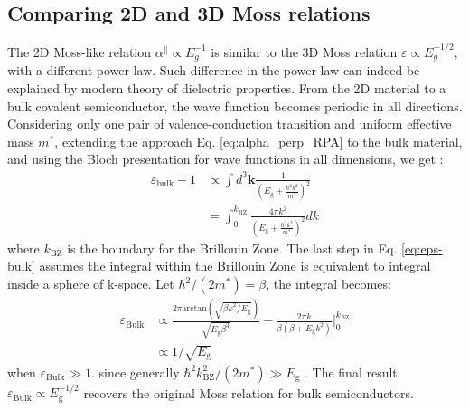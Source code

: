 \documentclass[manuscript=suppinfo,email=true,hyperref=true,keywords=false]{achemso}
\begin{document}
\subsection{Comparing 2D and 3D Moss relations}
\label{ssec:theory-2D}
The 2D Moss-like relation $\alpha^{\parallel} \propto E_{g}^{-1}$ is
similar to the 3D Moss relation $\varepsilon \propto E_{g}^{-1/2}$,
with a different power law. Such difference in the power law can
indeed be explained by modern theory of dielectric properties. From
the 2D material to a bulk covalent semiconductor, the wave function
becomes periodic in all directions. Considering only one pair of
valence-conduction transition and uniform effective mass $m^{*}$,
extending the approach Eq. \ref{eq:alpha_perp_RPA} to the bulk
material, and using the Bloch presentation for wave functions in all
dimensions, we get \cite{Jiang_2017_Eg_Eb}:
\begin{equation}
  \begin{aligned}
    \label{eq:eps-bulk}
    \varepsilon_{\mathrm{bulk}} - 1 &\propto \int d^{3}\mathbf{k}
    {\displaystyle \frac{1}{(E_{\mathrm{g}} + {\displaystyle
          \frac{\hbar^{2} k^{2}}{m^{*}}})^{2}}}\\
    &= \int_{0}^{k_{\mathrm{BZ}}} {\displaystyle
      \frac{4 \pi k^{2}}{(E_{\mathrm{g}} + {\displaystyle \frac{\hbar^{2}
            k^{2}}{m^{*}}})^{2}}} dk
  \end{aligned}
\end{equation}
where $k_{\mathrm{BZ}}$ is the boundary for the Brillouin Zone. The
last step in Eq. \ref{eq:eps-bulk} assumes the integral within the
Brillouin Zone is equivalent to integral inside a sphere of
k-space. Let $\hbar^{2}/(2 m^{*})=\beta$, the integral becomes:
\begin{equation}
  \begin{aligned}
    \label{eq:integral-BZ-bulk}
    \varepsilon_{\mathrm{Bulk}} &\propto {\displaystyle \frac{2 \pi
        \mathrm{arctan}(\sqrt{\beta k^{2}/E_{\mathrm{g}}})}{\sqrt{E_{\mathrm{g}} \beta^{3}}}
        - \frac{2\pi k}{\beta(\beta +E_{\mathrm{g}}k^{2})}
      } \bigg\rvert_{0}^{k_{\mathrm{BZ}}}\\
      &\propto 1/\sqrt{E_{\mathrm{g}}}
  \end{aligned}
\end{equation}
when $\varepsilon_{\mathrm{Bulk}} \gg 1$. since generally
$\hbar^{2}k_{\mathrm{BZ}}^{2}/(2m^{*}) \gg
E_{\mathrm{g}}$ \cite{Finkenrath_1988}. The final result $\varepsilon_{\mathrm{Bulk}} \propto E_{\mathrm{g}}^{-1/2}$ recovers the original Moss relation for bulk semiconductors.
\end{document}
